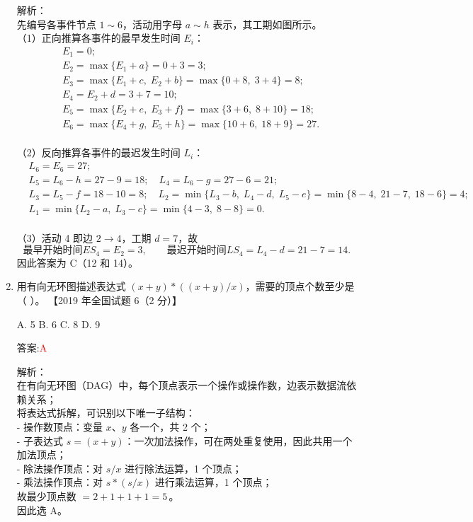 \documentclass[lang=cn,newtx,10pt,scheme=chinese]{../../../elegantbook}
\begin{document}
\begin{enumerate}
    解析：\\
    先编号各事件节点 $1\sim6$，活动用字母 $a\sim h$ 表示，其工期如图所示。\\
    （1）正向推算各事件的最早发生时间 $E_i$：  
    \[
    \begin{aligned}
      &E_1=0;\\
      &E_2=\max\{E_1+a\}=0+3=3;\\
      &E_3=\max\{E_1+c,\;E_2+b\}=\max\{0+8,\;3+4\}=8;\\
      &E_4=E_2+d=3+7=10;\\
      &E_5=\max\{E_2+e,\;E_3+f\}=\max\{3+6,\;8+10\}=18;\\
      &E_6=\max\{E_4+g,\;E_5+h\}=\max\{10+6,\;18+9\}=27.
    \end{aligned}
    \]\\
    （2）反向推算各事件的最迟发生时间 $L_i$：  
    \[
    \begin{aligned}
      &L_6=E_6=27;\\
      &L_5=L_6-h=27-9=18;\quad
       L_4=L_6-g=27-6=21;\\
      &L_3=L_5-f=18-10=8;\quad
       L_2=\min\{L_3-b,\;L_4-d,\;L_5-e\}=\min\{8-4,\;21-7,\;18-6\}=4;\\
      &L_1=\min\{L_2-a,\;L_3-c\}=\min\{4-3,\;8-8\}=0.
    \end{aligned}
    \]\\
    （3）活动 4 即边 $2\to4$，工期 $d=7$，故  
    \[
      \text{最早开始时间}ES_4=E_2=3,\qquad
      \text{最迟开始时间}LS_4=L_4-d=21-7=14.
    \]  
    因此答案为 C（12 和 14）。  
    \item 用有向无环图描述表达式 $(x + y) \ast ((x + y) / x)$，需要的顶点个数至少是（ ）。  
    【2019 年全国试题 6（2 分）】

    A. 5  
    B. 6  
    C. 8  
    D. 9  

    答案:\textcolor{red}{A}

    解析：\\
    在有向无环图（DAG）中，每个顶点表示一个操作或操作数，边表示数据流依赖关系；\\
    将表达式拆解，可识别以下唯一子结构：\\
    - 操作数顶点：变量 $x$、$y$ 各一个，共 2 个；\\
    - 子表达式 $s=(x+y)$：一次加法操作，可在两处重复使用，因此共用一个加法顶点；\\
    - 除法操作顶点：对 $s/x$ 进行除法运算，1 个顶点；\\
    - 乘法操作顶点：对 $s\ast(s/x)$ 进行乘法运算，1 个顶点；\\
    故最少顶点数 $=2+1+1+1=5\,$。\\
    因此选 A。\\
  


\end{enumerate}
\end{document}
